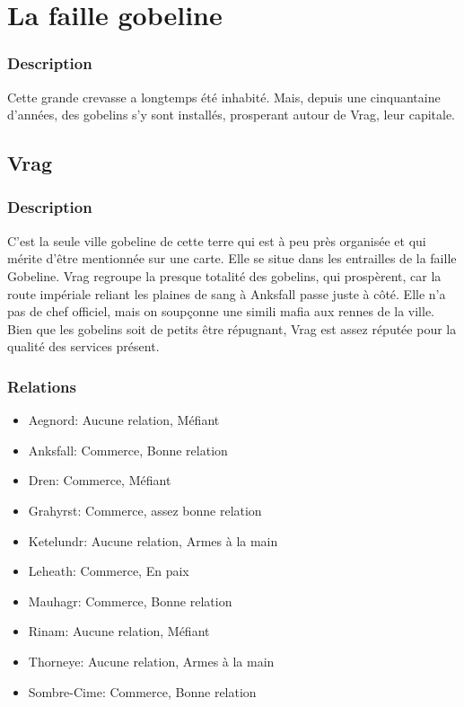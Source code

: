 \section{La faille gobeline}
\subsubsection{Description}
\hypertarget {lafaillegobeline}{}Cette grande crevasse a longtemps été inhabité.
Mais, depuis une cinquantaine d'années, des gobelins s'y sont installés, prosperant autour de Vrag, leur capitale.
\subsection{Vrag}
\subsubsection{Description}
\hypertarget{vrag}{}C’est la seule ville gobeline de cette terre qui est à peu près organisée et qui mérite d’être mentionnée sur une carte. Elle se situe dans les entrailles de la faille Gobeline. Vrag regroupe la presque totalité des gobelins, qui prospèrent, car la route impériale reliant les plaines de sang à Anksfall passe juste à côté. Elle n’a pas de chef officiel, mais on soupçonne une simili mafia aux rennes de la ville. Bien que les gobelins soit de petits être répugnant, Vrag est assez réputée pour la qualité des services présent. 
\subsubsection{Relations}
\begin{itemize}
\item Aegnord: Aucune relation, Méfiant  
\item Anksfall: Commerce, Bonne relation 
\item Dren: Commerce, Méfiant  
\item Grahyrst: Commerce, assez bonne relation   
\item Ketelundr: Aucune relation, Armes à la main
\item Leheath: Commerce, En paix 
\item Mauhagr: Commerce, Bonne relation  
\item Rinam: Aucune relation, Méfiant
\item Thorneye: Aucune relation, Armes à la main 
\item Sombre-Cime: Commerce, Bonne relation 
\end{itemize}
